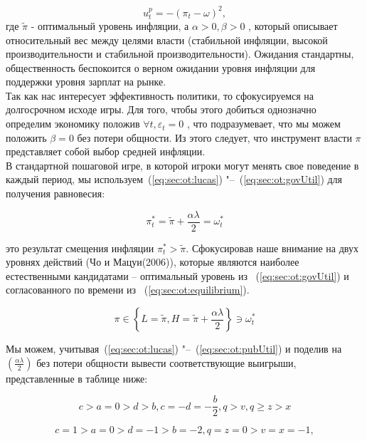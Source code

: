 \begin{equation}
\label{eq:sec:ot:pubUtil}
u^p_t=-(\pi_t - \omega)^2,
\end{equation}
где $\tilde{\pi}$ - оптимальный уровень инфляции, а $\alpha > 0, \beta > 0$ , который описывает относительный вес между целями власти (стабильной инфляции, высокой производительности и стабильной производительности). Ожидания стандартны, общественность беспокоится о верном ожидании уровня инфляции для поддержки уровня зарплат на рынке. 
\\

Так как нас интересует эффективность политики, то сфокусируемся на долгосрочном исходе игры. Для того, чтобы этого добиться однозначно определим экономику положив $\forall t, \varepsilon_t=0$ , что подразумевает, что мы можем положить $\beta=0$ без потери общности. Из этого следует, что инструмент власти $\pi$  представляет собой выбор средней инфляции.
\\

В стандартной пошаговой игре, в которой игроки могут менять свое поведение в каждый период, мы используем~(\ref{eq:sec:ot:lucas}) "--~(\ref{eq:sec:ot:govUtil}) для получения равновесия:

\begin{equation}
\label{eq:sec:ot:equilibrium}
\pi^*_t= \tilde{\pi} + \frac{\alpha\lambda}{2}= \omega^*_t
\end{equation}

это результат смещения инфляции $\pi^*_t > \tilde{\pi}$. Сфокусировав наше внимание на двух уровнях действий (Чо и Мацуи(2006)), которые являются наиболее естественными кандидатами – оптимальный уровень из ~(\ref{eq:sec:ot:govUtil}) и согласованного по времени из ~(\ref{eq:sec:ot:equilibrium}).

\begin{equation}
\label{eq:sec:ot:optimal}
\pi \in \left\{L=\tilde{\pi}, H=\tilde{\pi}+\frac{\alpha\lambda}{2} \right\} \ni \omega^*_t
\end{equation}

Мы можем, учитывая~(\ref{eq:sec:ot:lucas}) "--~(\ref{eq:sec:ot:pubUtil}) и поделив на $\left(\frac{\alpha\lambda}{2}\right)$  без потери общности вывести соответствующие выигрыши, представленные в таблице ниже:

\begin{equation}
	\label{eq:sec:ot:constraint}
	c>a=0 > d > b,c=-d=-\frac{b}{2}, q>v,q\ge z>x
\end{equation}

\begin{equation}
\label{eq:sec:ot:exampleConstraint}
c=1 > a=0 > d=-1 > b=-2, q=z=0 > v=x=-1,
\end{equation}

